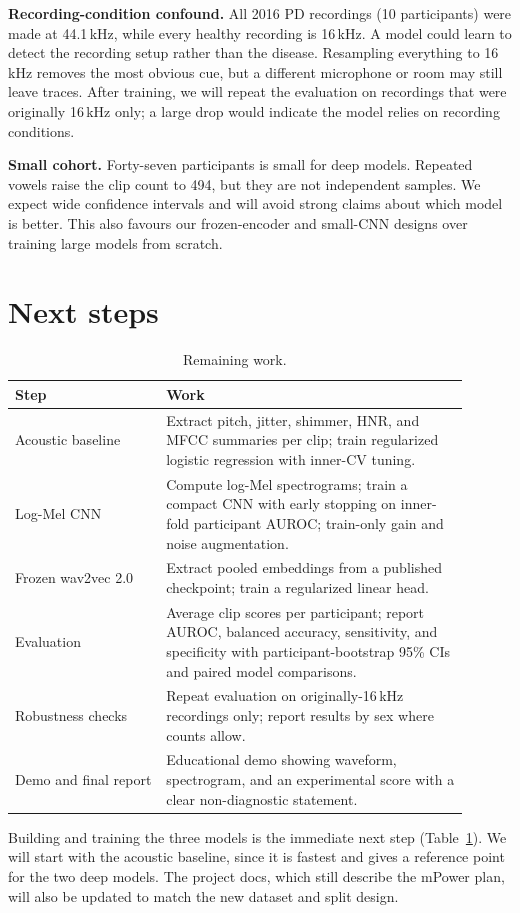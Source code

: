 \documentclass{article}
\begin{document}
\textbf{Recording-condition confound.} All 2016 PD recordings (10 participants) were made at 44.1\,kHz, while every healthy recording is 16\,kHz. A model could learn to detect the recording setup rather than the disease. Resampling everything to 16\,kHz removes the most obvious cue, but a different microphone or room may still leave traces. After training, we will repeat the evaluation on recordings that were originally 16\,kHz only; a large drop would indicate the model relies on recording conditions.

\textbf{Small cohort.} Forty-seven participants is small for deep models. Repeated vowels raise the clip count to 494, but they are not independent samples. We expect wide confidence intervals and will avoid strong claims about which model is better. This also favours our frozen-encoder and small-CNN designs over training large models from scratch.

\section{Next steps}
\begin{table}[t]
\caption{Remaining work.}
\label{tab:plan}
\centering
\small
\begin{tabular}{p{0.3\linewidth}p{0.6\linewidth}}
\toprule
Step & Work \\
\midrule
Acoustic baseline & Extract pitch, jitter, shimmer, HNR, and MFCC summaries per clip; train regularized logistic regression with inner-CV tuning. \\
Log-Mel CNN & Compute log-Mel spectrograms; train a compact CNN with early stopping on inner-fold participant AUROC; train-only gain and noise augmentation. \\
Frozen wav2vec 2.0 & Extract pooled embeddings from a published checkpoint; train a regularized linear head. \\
Evaluation & Average clip scores per participant; report AUROC, balanced accuracy, sensitivity, and specificity with participant-bootstrap 95\% CIs and paired model comparisons. \\
Robustness checks & Repeat evaluation on originally-16\,kHz recordings only; report results by sex where counts allow. \\
Demo and final report & Educational demo showing waveform, spectrogram, and an experimental score with a clear non-diagnostic statement. \\
\bottomrule
\end{tabular}
\end{table}
Building and training the three models is the immediate next step (Table~\ref{tab:plan}). We will start with the acoustic baseline, since it is fastest and gives a reference point for the two deep models. The project docs, which still describe the mPower plan, will also be updated to match the new dataset and split design.
\end{document}
